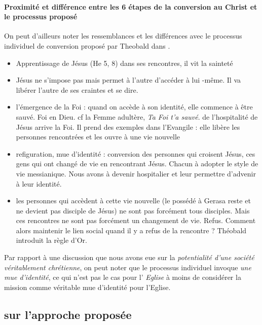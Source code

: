 \paragraph{Proximité et différence entre les 6 étapes de la conversion au Christ et le processus proposé } On peut d'ailleurs noter les ressemblances et les différences avec le processus individuel de conversion proposé par Theobald dans \cite{theobald_christianisme_2007}.
\begin{itemize}
    \item Apprentissage de Jésus (He 5, 8) dans ses rencontres, il vit la sainteté

\item Jésus ne s'impose pas mais permet à l'autre d'accéder à lui -même. Il va libérer l'autre de ses craintes et se dire. 
\item l'émergence de la Foi : quand on accède à son identité, elle commence à être sauvé. Foi en Dieu. cf la Femme adultère, \textit{Ta Foi t'a sauvé}. de l'hospitalité de Jésus arrive la Foi. Il prend des exemples dans l'Evangile : elle libère les personnes rencontrées et les ouvre à une vie nouvelle
\item refiguration, mue d'identité : conversion des personnes qui croisent Jésus, ces gens qui ont changé de vie en rencontrant Jésus. Chacun à adopter le style de vie messianique. Nous avons à devenir hospitalier et leur permettre d'advenir à leur identité.
\item les personnes qui accèdent à cette vie nouvelle ({le possédé à Gerasa reste et ne devient pas disciple de Jésus}) ne sont pas forcément tous disciples. Mais ces rencontres ne sont pas forcément un changement de vie. Refus. Comment alors maintenir le lien social quand il y a refus de la rencontre ? 
Théobald introduit la règle d'Or.
\end{itemize}
 Par rapport à une discussion que nous avons eue sur la \textit{potentialité d'une société véritablement chrétienne}, on peut noter que le processus individuel invoque \textit{une mue d'identité}, ce qui n'est pas le cas pour l' \textit{Eglise} à moins de considérer la mission comme véritable mue d'identité pour l'Eglise.

\subsection{sur l'approche proposée}

